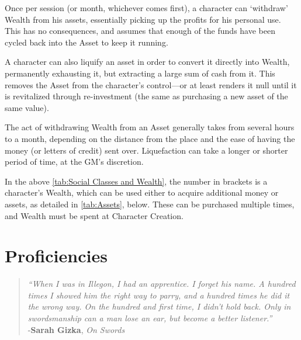 \documentclass[oneside,11pt,english]{book}
\begin{document}
Once per session (or month, whichever comes first), a character can ‘withdraw’ Wealth from his assets, 
essentially picking up the profits for his personal use. This has no consequences, and assumes that enough 
of the funds have been cycled back into the Asset to keep it running. 

A character can also liquify an asset in order to convert it directly into Wealth, permanently exhausting it, 
but extracting a large sum of cash from it. This removes the Asset from the character’s control—or at 
least renders it null until it is revitalized through re-investment (the same as purchasing a new asset of the 
same value).

The act of withdrawing Wealth from an Asset generally takes from several hours to a month, depending 
on the distance from the place and the ease of having the money (or letters of credit) sent over. 
Liquefaction can take a longer or shorter period of time, at the GM’s discretion. 

In the above \autoref{tab:Social Classes and Wealth}, the number in brackets is
a character’s Wealth, which can be used either to acquire additional money or
assets, as detailed in \autoref{tab:Assets}, below. These can be purchased
multiple times, and Wealth must be spent at Character Creation. 


\chapter{Proficiencies}\label{ch:proficiencies} 
\startcontents[chapters]
\clearpage
\begin{quote}
  \centering
  \emph{“When I was in Illegon, I had an apprentice. I forget his name. A
    hundred times I showed him the right way to parry, and a hundred times he
    did it the wrong way. On the hundred and first time, I didn’t hold back.
    Only in swordsmanship can a man lose an ear, but become a better
    listener.”}\\ 
  \hfill -\textbf{Sarah Gizka}, \textit{On Swords}
\end{quote}
\end{document}
